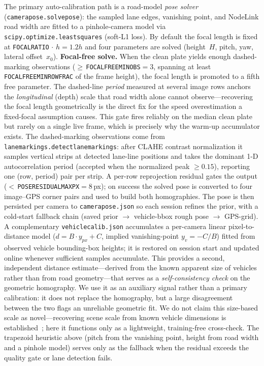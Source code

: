 \documentclass[conference]{IEEEtran}
\renewcommand{\_}{\textunderscore\allowbreak}
\begin{document}
The primary auto-calibration path is a road-model \emph{pose solver}
(\texttt{camera\_pose.solve\_pose}): the sampled lane edges, vanishing point, and
NodeLink road width are fitted to a pinhole-camera model via
\texttt{scipy.optimize.least\_squares} (soft-L1 loss). By default the focal length is
fixed at \texttt{FOCAL\_RATIO}$\,{\cdot}\,h = 1.2h$ and four parameters are solved
(height~$H$, pitch, yaw, lateral offset~$x_0$).
\textbf{Focal-free solve.} When the clean plate yields enough dashed-marking
observations ($\ge$\,\texttt{FOCAL\_FREE\_MIN\_OBS}${=}3$, spanning at least
\texttt{FOCAL\_FREE\_MIN\_ROW\_FRAC} of the frame height), the focal length is promoted
to a fifth free parameter. The dashed-line \emph{period} measured at several image rows
anchors the \emph{longitudinal} (depth) scale that road width alone cannot
observe---recovering the focal length geometrically is the direct fix for the speed
overestimation a fixed-focal assumption causes. This gate fires reliably on the median
clean plate but rarely on a single live frame, which is precisely why the warm-up
accumulator exists. The dashed-marking observations come from
\texttt{lane\_markings.detect\_lane\_markings}: after CLAHE contrast normalization it
samples vertical strips at detected lane-line positions and takes the dominant 1-D
autocorrelation period (accepted when the normalized peak $\ge 0.15$), reporting one
(row, period) pair per strip. A per-row reprojection residual gates the output
($<$\,\texttt{POSE\_RESIDUAL\_MAX\_PX}${=}8$\,px); on success the solved pose is
converted to four image--GPS corner pairs and used to build both homographies. The pose
is then persisted per camera to \texttt{camera\_pose.json} so each session refines the
prior, with a cold-start fallback chain (saved prior $\to$ vehicle-bbox rough pose $\to$
GPS-grid).
A complementary \texttt{vehicle\_calib.json} accumulates a per-camera linear
pixel-to-distance model ($d = B{\cdot}y_{px} + C$, implied vanishing-point
$y_v{=}-C/B$) fitted from observed vehicle bounding-box heights; it is restored
on session start and updated online whenever sufficient samples accumulate.
This provides a second, independent distance estimate---derived from the known
apparent size of vehicles rather than from road geometry---that serves as a
\emph{self-consistency check} on the geometric homography. We use it as an
auxiliary signal rather than a primary calibration: it does not replace the
homography, but a large disagreement between the two flags an unreliable
geometric fit. We do not claim this size-based scale as novel---recovering scene
scale from known vehicle dimensions is established~\cite{sochor2019,revaud2021};
here it functions only as a lightweight, training-free cross-check.
The trapezoid heuristic above (pitch from the vanishing point, height from road width
and a pinhole model) serves only as the fallback when the residual exceeds the quality
gate or lane detection fails.
\end{document}
